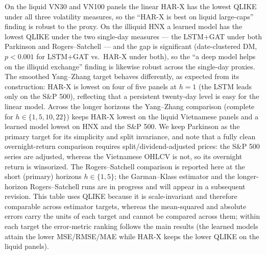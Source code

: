 \documentclass[runningheads]{llncs}
\begin{document}
On the liquid VN30 and VN100 panels the linear HAR-X has the lowest QLIKE under all three volatility measures,
so the ``HAR-X is best on liquid large-caps'' finding is robust to the proxy. On the illiquid HNX a learned
model has the lowest QLIKE under the two single-day measures --- the LSTM+GAT under both Parkinson and
Rogers--Satchell --- and the gap is significant (date-clustered DM, $p<0.001$ for LSTM+GAT vs.\ HAR-X under both),
so the ``a deep model helps on the illiquid exchange'' finding is likewise robust across the single-day proxies.
The smoothed Yang--Zhang target behaves differently, as expected from its construction: HAR-X is lowest on four
of five panels at $h{=}1$ (the LSTM leads only on the S\&P 500), reflecting that a persistent twenty-day level is
easy for the linear model. Across the longer horizons the Yang--Zhang comparison (complete for
$h\in\{1,5,10,22\}$) keeps HAR-X lowest on the liquid Vietnamese panels and a learned model lowest on HNX and the
S\&P 500. We keep Parkinson as the primary target for its simplicity and split invariance, and note that a fully
clean overnight-return comparison requires split/dividend-adjusted prices: the S\&P 500 series are adjusted,
whereas the Vietnamese OHLCV is not, so its overnight return is winsorized. The Rogers--Satchell comparison is
reported here at the short (primary) horizons $h\in\{1,5\}$; the Garman--Klass estimator and the longer-horizon
Rogers--Satchell runs are in progress and will appear in a subsequent revision. This table uses QLIKE because it
is scale-invariant and therefore comparable across estimator targets, whereas the mean-squared and absolute
errors carry the units of each target and cannot be compared across them; within each target the error-metric
ranking follows the main results (the learned models attain the lower MSE/RMSE/MAE while HAR-X keeps the lower
QLIKE on the liquid panels).
\end{document}
